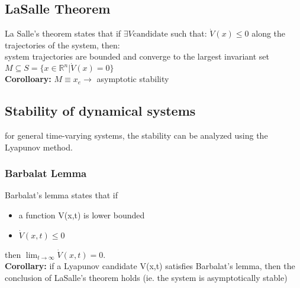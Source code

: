\documentclass[a4paper,12pt]{article}
\begin{document}
\subsection{LaSalle Theorem}\label{sec:LaSalle Theorem}
La Salle's theorem states that if $\exists V \text{candidate}$ such 
that: $\dot{V}(x) \leq 0$ along the trajectories of the system, then:\\
system trajectories are bounded and converge to the largest invariant
 set \\$M \subseteq S = \{x \in \mathbb{R}^n | \dot{V}(x) = 0\}$\\
 \textbf{Corolloary:} $M \equiv {x_e} \rightarrow$ asymptotic stability

 \subsection{Stability of dynamical systems}
 for general time-varying systems, the stability can be 
 analyzed using the Lyapunov method.\\
 \subsubsection{Barbalat Lemma}
    Barbalat's lemma states that if \begin{itemize}
        \item a function V(x,t) is lower bounded
        \item $\dot{V}(x,t) \leq 0$ 
    \end{itemize}
    then $\lim_{t \to \infty} \dot{V}(x,t) = 0$.\\
    \textbf{Corollary:} if a Lyapunov candidate V(x,t) 
    satisfies Barbalat's lemma, then the conclusion of 
    LaSalle's theorem holds (ie. the system is asymptotically stable)
\end{document}
